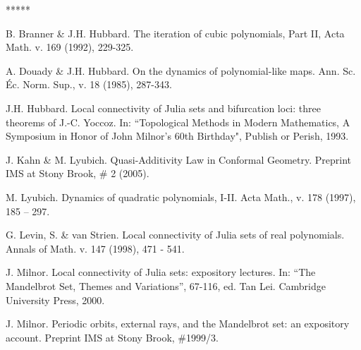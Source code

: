 

\begin{thebibliography}{*****}


 B. Branner \& J.H. Hubbard.
  The iteration of cubic polynomials,
  Part II,  Acta Math. v. 169 (1992), 229-325.

 A. Douady \& J.H. Hubbard. On the dynamics of polynomial-like maps.
    Ann. Sc. \'{E}c. Norm. Sup., v. 18 (1985), 287-343.


 J.H. Hubbard.  Local connectivity of Julia sets and bifurcation loci:
      three theorems of J.-C. Yoccoz. 
     In: ``Topological Methods in Modern Mathematics, A Symposium in
     Honor of John Milnor's 60th Birthday", Publish or Perish, 1993.



 J. Kahn \& M. Lyubich.
   Quasi-Additivity Law in Conformal Geometry. Preprint IMS at Stony Brook, \# 2 (2005). 

 M. Lyubich. Dynamics of quadratic polynomials, I-II. 
   Acta Math., v. 178 (1997), 185 -- 297.


 G. Levin, S. \& van Strien. 
 Local connectivity of Julia sets  of real polynomials.
  Annals of Math. v. 147 (1998), 471 - 541. 

 J. Milnor.
     Local connectivity of Julia sets: expository lectures.
     In: ``The Mandelbrot Set, Themes and Variations'',  67-116, ed. Tan Lei.  
     Cambridge University Press, 2000.

 J. Milnor.
  Periodic orbits, external rays, and the Mandelbrot set: an expository account.
  Preprint IMS at Stony Brook, \#1999/3.

\end{thebibliography}















